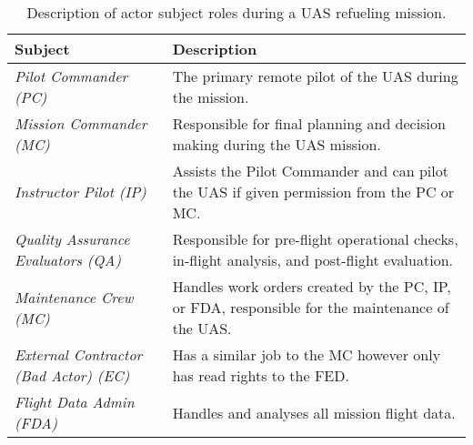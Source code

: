 \documentclass[10pt,journal,compsoc]{IEEEtran}
\begin{document}
\begin{table*}[]
  \caption{Description of actor subject roles during a UAS refueling mission.}
  \begin{tabular}{ll}
  \hline
  \textbf{Subject}                           & \textbf{Description}                                                                                       \\ 
  \hline
  \textit{Pilot Commander (PC)}                  & The primary remote pilot of the UAS during the mission.                                                    \\
  \textit{Mission Commander (MC)}                & Responsible for final planning and decision making during the UAS mission.                                 \\
  \textit{Instructor Pilot (IP)}                 & Assists the Pilot Commander and can pilot the UAS if given permission from the PC or MC.                   \\
  \textit{Quality Assurance Evaluators (QA)}     & Responsible for pre-flight operational checks, in-flight analysis, and post-flight evaluation.             \\
  \textit{Maintenance Crew (MC)}                 & Handles work orders created by the PC, IP, or FDA, responsible for the maintenance of the UAS.             \\
  \textit{External Contractor (Bad Actor) (EC)}  & Has a similar job to the MC however only has read rights to the FED.                                       \\
  \textit{Flight Data Admin (FDA)}               & Handles and analyses all mission flight data.                                                              \\
  \hline
  \end{tabular}
\end{table*}
\end{document}
